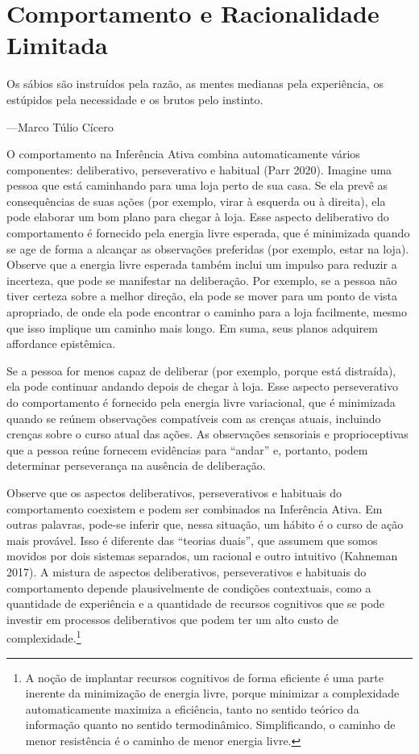 \documentclass[
  12pt,
]{book}
\begin{document}
\hypertarget{comportamento-e-racionalidade-limitada}{%
\section{Comportamento e Racionalidade Limitada}\label{comportamento-e-racionalidade-limitada}}

Os sábios são instruídos pela razão, as mentes medianas pela experiência, os estúpidos pela necessidade e os brutos pelo instinto.

---Marco Túlio Cícero

O comportamento na Inferência Ativa combina automaticamente vários componentes: deliberativo, perseverativo e habitual (Parr 2020). Imagine uma pessoa que está caminhando para uma loja perto de sua casa. Se ela prevê as consequências de suas ações (por exemplo, virar à esquerda ou à direita), ela pode elaborar um bom plano para chegar à loja. Esse aspecto deliberativo do comportamento é fornecido pela energia livre esperada, que é minimizada quando se age de forma a alcançar as observações preferidas (por exemplo, estar na loja). Observe que a energia livre esperada também inclui um impulso para reduzir a incerteza, que pode se manifestar na deliberação. Por exemplo, se a pessoa não tiver certeza sobre a melhor direção, ela pode se mover para um ponto de vista apropriado, de onde ela pode encontrar o caminho para a loja facilmente, mesmo que isso implique um caminho mais longo. Em suma, seus planos adquirem affordance epistêmica.

Se a pessoa for menos capaz de deliberar (por exemplo, porque está distraída), ela pode continuar andando depois de chegar à loja. Esse aspecto perseverativo do comportamento é fornecido pela energia livre variacional, que é minimizada quando se reúnem observações compatíveis com as crenças atuais, incluindo crenças sobre o curso atual das ações. As observações sensoriais e proprioceptivas que a pessoa reúne fornecem evidências para ``andar'' e, portanto, podem determinar perseverança na ausência de deliberação.

Observe que os aspectos deliberativos, perseverativos e habituais do comportamento coexistem e podem ser combinados na Inferência Ativa. Em outras palavras, pode-se inferir que, nessa situação, um hábito é o curso de ação mais provável. Isso é diferente das ``teorias duais'', que assumem que somos movidos por dois sistemas separados, um racional e outro intuitivo (Kahneman 2017). A mistura de aspectos deliberativos, perseverativos e habituais do comportamento depende plausivelmente de condições contextuais, como a quantidade de experiência e a quantidade de recursos cognitivos que se pode investir em processos deliberativos que podem ter um alto custo de complexidade.\footnote{A noção de implantar recursos cognitivos de forma eficiente é uma parte inerente da minimização de energia livre, porque minimizar a complexidade automaticamente maximiza a eficiência, tanto no sentido teórico da informação quanto no sentido termodinâmico. Simplificando, o caminho de menor resistência é o caminho de menor energia livre.}
\end{document}
